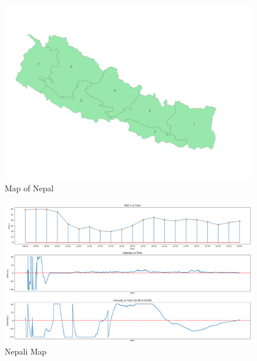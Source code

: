 \lipsum[1-2]

\begin{figure}[ht]
    \centering
    \includegraphics[width=1\linewidth]{images/np.png}
    \caption{Map of Nepal}
    \label{national map}
\end{figure}


\begin{figure}
    \centering
    \includegraphics[width=1\linewidth]{images/aq.png}
    \caption{Nepali Map}
    \label{fig:enter-label}
\end{figure}
\lipsum[2-3]